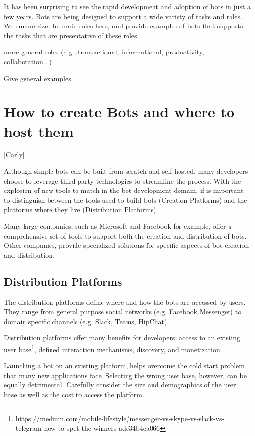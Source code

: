 \documentclass{sig-alternate}
\begin{document}

It has been surprising to see the rapid development and adoption of bots in just a few years.  
Bots are being designed to support a wide variety of tasks and roles.  We summarize the main roles here, and provide examples of bots that supports the tasks that are presentative of these roles. 

	more general roles (e.g., transactional, informational, productivity, collaboration...)
	
	Give general examples 


\section{How to create Bots and where to host them}
	[Carly]

	Although simple bots can be built from scratch and self-hosted, many developers choose to leverage third-party technologies to streamline the process. With the explosion of new tools to match in the bot development domain, if is important to distinguish between the tools used to build bots (Creation Platforms) and the platforms where they live (Distribution Platforms).

	Many large companies, such as Microsoft and Facebook for example, offer a comprehensive set of tools to support both the creation and distribution of bots. Other companies, provide specialized solutions for specific aspects of bot creation and distribution. 

	\subsection{Distribution Platforms}
	The distribution platforms define where and how the bots are accessed by users. They range from general purpose social networks (e.g. Facebook Messenger) to domain specific channels (e.g. Slack, Teams, HipChat).  

	Distribution platforms offer many benefits for developers: access to an existing user base\footnote{https://medium.com/mobile-lifestyle/messenger-vs-skype-vs-slack-vs-telegram-how-to-spot-the-winners-adc34b4ca066\label{How_to_spot_the_winners}}, defined interaction mechanisms, discovery, and monetization.  

	Launching a bot on an existing platform, helps overcome the cold start problem that many new applications face. Selecting the wrong user base, however, can be equally detrimental. Carefully consider the size and demographics of the user base as well as the cost to access the platform. 
\end{document}
